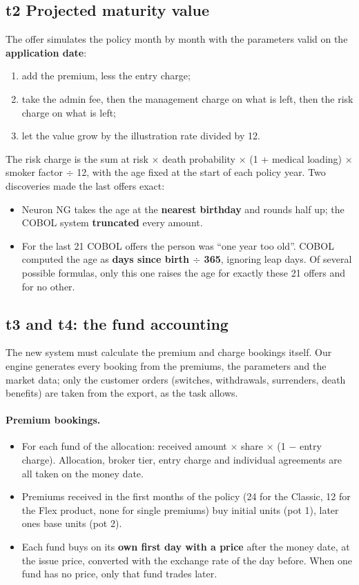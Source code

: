 \documentclass[11pt,a4paper]{article}
\begin{document}
\subsection{t2 Projected maturity value}
The offer simulates the policy month by month with the parameters valid on the \textbf{application date}:
\begin{enumerate}
  \item add the premium, less the entry charge;
  \item take the admin fee, then the management charge on what is left, then the risk charge on what is left;
  \item let the value grow by the illustration rate divided by 12.
\end{enumerate}
The risk charge is the sum at risk $\times$ death probability $\times$ (1 + medical loading) $\times$ smoker factor
$\div$ 12, with the age fixed at the start of each policy year. Two discoveries made the last offers exact:
\begin{itemize}
  \item Neuron NG takes the age at the \textbf{nearest birthday} and rounds half up; the COBOL system
        \textbf{truncated} every amount.
  \item For the last 21 COBOL offers the person was ``one year too old''. COBOL computed the age as
        \textbf{days since birth $\div$ 365}, ignoring leap days. Of several possible formulas, only this one raises the
        age for exactly these 21 offers and for no other.
\end{itemize}

\subsection{t3 and t4: the fund accounting}
The new system must calculate the premium and charge bookings itself. Our engine generates every booking from the
premiums, the parameters and the market data; only the customer orders (switches, withdrawals, surrenders, death
benefits) are taken from the export, as the task allows.

\paragraph{Premium bookings.}
\begin{itemize}
  \item For each fund of the allocation: received amount $\times$ share $\times$ (1 $-$ entry charge). Allocation,
        broker tier, entry charge and individual agreements are all taken on the money date.
  \item Premiums received in the first months of the policy (24 for the Classic, 12 for the Flex product, none
        for single premiums) buy initial units (pot 1), later ones base units (pot 2).
  \item Each fund buys on its \textbf{own first day with a price} after the money date, at the issue price,
        converted with the exchange rate of the day before. When one fund has no price, only that fund trades later.
\end{itemize}
\end{document}
